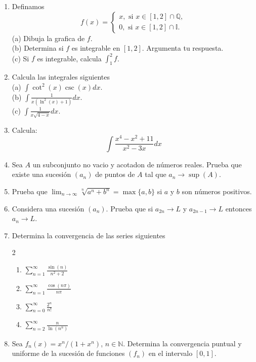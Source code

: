 \documentclass[12pt,oneside,spanish]{amsbook}
\theoremstyle{plain}
\theoremstyle{definition}
\theoremstyle{remark}
\begin{document}
    \begin{enumerate}
        \item Definamos
        \begin{equation*}
            f(x)=
            \begin{cases}
                x,\text{ si }x\in[1,2]\cap\mathbb{Q},\\
                0,\text{ si }x\in[1,2]\cap\mathbb{I}.
            \end{cases}
        \end{equation*}
        (a) Dibuja la grafica de $f$.\\
        (b) Determina si $f$ es integrable en $[1,2]$. Argumenta tu respuesta.\\
        (c) Si $f$ es integrable, calcula $\int_{1}^{2}f$.
        \item Calcula las integrales siguientes\\
        (a) $\int\cot^{2}(x)\csc(x)dx$.\\
        (b) $\int\frac{1}{x(\ln^{2}(x)+1)}dx$.\\
        (c) $\int\frac{1}{x\sqrt{4-x}}dx$.
        \item Calcula:
        \begin{equation*}
            \int\frac{x^{4}-x^{2}+11}{x^{2}-3x}dx
        \end{equation*}
        \item Sea $A$ un subconjunto no vacio y acotadon de números reales. Prueba que existe una sucesión $(a_{n})$ de puntos de $A$
        tal que $a_{n}\to\sup(A)$.
        \item Prueba que $\lim_{n\to\infty}\sqrt[n]{a^{n}+b^{n}}=\max\{a,b\}$ si $a$ y $b$ son números positivos.
        \item Considera una sucesión $(a_{n})$. Prueba que si $a_{2n}\to L$ y $a_{2n-1}\to L$ entonces $a_{n}\to L$.
        \item Determina la convergencia de las series siguientes
        \begin{multicols}{2}
            \begin{enumerate}
                \item[(a)] $\sum_{n=1}^{\infty}\frac{\sin(n)}{n^{2}+2}$
                \item[(b)] $\sum_{n=1}^{\infty}\frac{\cos(n\pi)}{n\pi}$ 
                \item[(c)] $\sum_{n=0}^{\infty}\frac{2^{n}}{n!}$
                \item[(d)] $\sum_{n=2}^{\infty}\frac{n}{\ln(n^{n})}$  
            \end{enumerate}
        \end{multicols}
        \item Sea $f_{n}(x)=x^{n}/(1+x^{n})$, $n\in\mathbb{N}$. Determina la convergencia puntual y uniforme de la sucesión de funciones
        $(f_{n})$ en el intervalo $[0,1]$.
    \end{enumerate}
\end{document}
